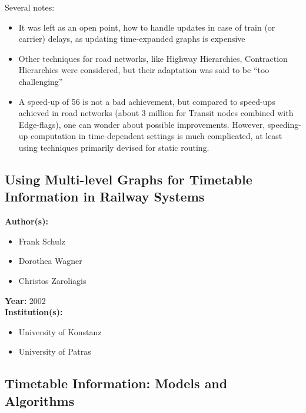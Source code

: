 \documentclass[a4paper]{article}
\newenvironment{itemizesp}
{
    \begin{itemize}
}
{
    \end{itemize}
}
\newcommand{\textbff}[1]{{\large \textbf{#1}}}
\begin{document}
        Several notes:
        \begin{itemize}
          \item It was left as an open point, how to handle updates in case of train (or carrier) delays, as updating time-expanded graphs is expensive
          \item Other techniques for road networks, like Highway Hierarchies, Contraction Hierarchies were considered, but their adaptation was said to be ``too challenging''
          \item A speed-up of 56 is not a bad achievement, but compared to speed-ups achieved in road networks (about $3$ million for Transit nodes combined with Edge-flags), one can wonder about possible improvements. However, speeding-up computation in time-dependent settings is much complicated, at least using techniques primarily devised for static routing.
        \end{itemize}

        \subsection{Using Multi-level Graphs for Timetable Information in Railway Systems }
        \label{subsec:multilevelgr}

        \textbff{Author(s): }
        \begin{itemizesp}
            \item Frank Schulz
            \item Dorothea Wagner
            \item Christos Zaroliagis
        \end{itemizesp}
        \textbff{Year: }2002 \\
        \textbff{Institution(s): }
        \begin{itemizesp}
            \item University of Konstanz
            \item University of Patras
        \end{itemizesp}

        \subsection{Timetable Information: Models and Algorithms}
        \label{subsec:timetablemodelsalgs}
\end{document}
